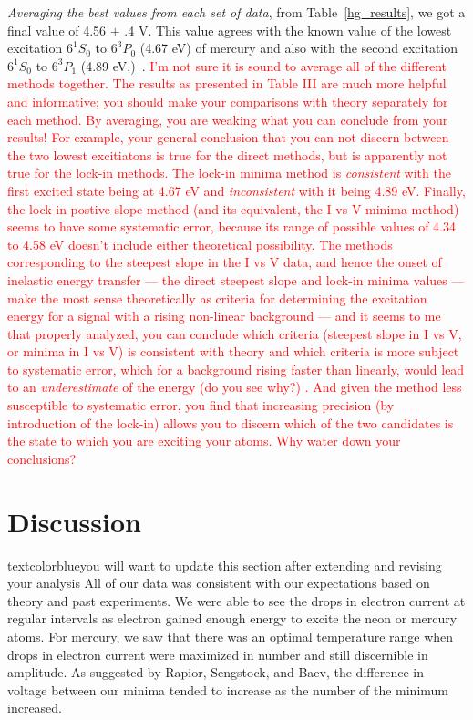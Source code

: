 \documentclass[prb,preprint]{revtex4-1}
\begin{document}
\textit{Averaging the best values from each set of data}, from Table~\ref{hg_results}, we got a final value of 4.56 $\pm$ .4 V. This value agrees with the known value of the lowest excitation $6^{1}S_{0}$ to $6^{3}P_{0}$ (4.67 eV) of mercury and also with the second excitation $6^{1}S_{0}$ to $6^{3}P_{1}$ (4.89 eV.)~\cite{newfeatures}. \textcolor{red}{I'm not sure it is sound to average all of the different methods together. The results as presented in Table III are much more helpful and informative; you should make your comparisons with theory separately for each method. By averaging, you are weaking what you can conclude from your results! For example, your general conclusion that you can not discern between the two lowest excitiatons is true for the direct methods, but is apparently not true for the lock-in methods. The lock-in minima method is \textit{consistent} with the first excited state being at 4.67 eV and \textit{inconsistent} with it being 4.89 eV. Finally, the lock-in postive slope method (and its equivalent, the I vs V minima method) seems to have some systematic error, because its range of possible values of 4.34 to 4.58 eV doesn't include either theoretical possibility. The methods  corresponding to the steepest slope in the I vs V data, and hence the onset of inelastic energy transfer --- the direct steepest slope and lock-in minima values ---  make the most sense theoretically as criteria for determining the excitation energy for a signal with a rising non-linear background --- and it seems to me that properly analyzed, you can conclude which criteria (steepest slope in I vs V, or minima in I vs V) is consistent with theory and which criteria is more subject to systematic error, which for a background rising faster than linearly, would lead to an \textit{underestimate} of the energy (do you see why?) . And given the method less susceptible to systematic error, you find that increasing precision (by introduction of the lock-in) allows you to discern which of the two candidates is the state to which you are exciting your atoms. Why water down your conclusions?   }

\section{Discussion}

textcolor{blue}{you will want to update this section after extending and revising your analysis}
All of our data was consistent with our expectations based on theory and past experiments. We were able to see the drops in electron current at regular intervals as electron gained enough energy to excite the neon or mercury atoms. For mercury, we saw that there was an optimal temperature range when drops in electron current were maximized in number and still discernible in amplitude. As suggested by Rapior,  Sengstock, and Baev, the difference in voltage between our minima tended to increase as the number of the minimum increased. 
\end{document}
